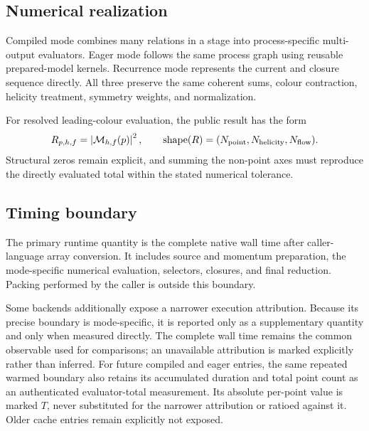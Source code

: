 \subsection{Numerical realization}

Compiled mode combines many relations in a stage into process-specific
multi-output evaluators. Eager mode follows the same process graph using
reusable prepared-model kernels. Recurrence mode represents the current and
closure sequence directly. All three preserve the same coherent sums, colour
contraction, helicity treatment, symmetry weights, and normalization.

For resolved leading-colour evaluation, the public result has the form
\begin{equation}
  R_{p,h,f}=\left|\mathcal M_{h,f}(p)\right|^2,
  \qquad
  \operatorname{shape}(R)=
  (N_{\rm point},N_{\rm helicity},N_{\rm flow}) .
  \label{eq:zgg-resolved-shape}
\end{equation}
Structural zeros remain explicit, and summing the non-point axes must reproduce
the directly evaluated total within the stated numerical tolerance.

\subsection{Timing boundary}

The primary runtime quantity is the complete native wall time after
caller-language array conversion. It includes source and momentum preparation,
the mode-specific numerical evaluation, selectors, closures, and final
reduction. Packing performed by the caller is outside this boundary.

Some backends additionally expose a narrower execution attribution. Because
its precise boundary is mode-specific, it is reported only as a supplementary
quantity and only when measured directly. The complete wall time remains the
common observable used for comparisons; an unavailable attribution is marked
explicitly rather than inferred. For future compiled and eager entries, the
same repeated warmed boundary also retains its accumulated duration and total
point count as an authenticated evaluator-total measurement. Its absolute
per-point value is marked \(T\), never substituted for the narrower attribution
or ratioed against it. Older cache entries remain explicitly not exposed.
